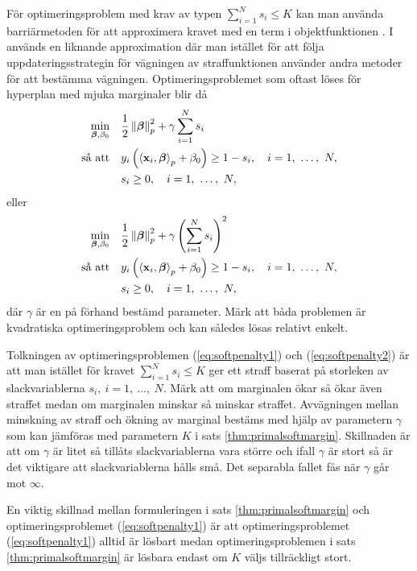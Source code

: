 \documentclass[a4paper, 12pt]{report}
\theoremstyle{definition}
\theoremstyle{remark}
\newcommand{\bfbeta}{{\boldsymbol{\beta}}}
\newcommand{\bfx}{\mathbf{x}}
\newcommand{\llangle}{\left\langle}
\newcommand{\rrangle}{\right\rangle}
\newcommand{\inner}[2]{\llangle #1, #2 \rrangle}
\begin{document}
För optimeringsproblem med krav av typen $\sum_{i=1}^{N}s_i\leq K$ kan man använda barriärmetoden för att approximera kravet med en term i objektfunktionen \cite{Boyd}. I \cite{CortesVapnik} används en liknande approximation där man istället för att följa uppdateringsstrategin för vägningen av straffunktionen använder andra metoder för att bestämma vägningen. Optimeringsproblemet som oftast löses för hyperplan med mjuka marginaler blir då
\begin{equation}\label{eq:softpenalty1}
\begin{aligned}
	\operatornamewithlimits{min}_{\bfbeta, \beta_0} & & &\frac{1}{2}\left\|\bfbeta
\right\|_p^2 + \gamma\sum_{i=1}^{N} s_i\\
	\text{så att} & & &y_i\left(\inner{\bfx_i}{\bfbeta}_p+\beta_0\right)\geq 1 - s_i,\quad i=1,~\dots,~N,\\
	& & &s_i\geq0,\quad i=1,~\dots,~N,
\end{aligned}
\end{equation}
eller
\begin{equation}\label{eq:softpenalty2}
\begin{aligned}
\operatornamewithlimits{min}_{\bfbeta, \beta_0} & & &\frac{1}{2}\left\|\bfbeta
\right\|_p^2 + \gamma\left(\sum_{i=1}^{N} s_i\right)^2\\
\text{så att} & & &y_i\left(\inner{\bfx_i}{\bfbeta}_p+\beta_0\right)\geq 1 - s_i,\quad i=1,~\dots,~N,\\
& & &s_i\geq0,\quad i=1,~\dots,~N,
\end{aligned}
\end{equation}
där $\gamma$ är en på förhand bestämd parameter.
Märk att båda problemen är kvadratiska optimeringsproblem och kan således lösas relativt enkelt.

Tolkningen av optimeringsproblemen (\ref{eq:softpenalty1}) och (\ref{eq:softpenalty2}) är att man istället för kravet $\sum_{i=1}^{N}s_i\leq K$ ger ett straff baserat på storleken av slackvariablerna $s_i,~i=1,~\dots,~N$. Märk att om marginalen ökar så ökar även straffet medan om marginalen minskar så minskar straffet. Avvägningen mellan minskning av straff och ökning av marginal bestäms med hjälp av parametern $\gamma$ som kan jämföras med parametern $K$ i sats \ref{thm:primalsoftmargin}. Skillnaden är att om $\gamma$ är litet så tillåts slackvariablerna vara större och ifall $\gamma$ är stort så är det viktigare att slackvariablerna hålls små. Det separabla fallet fås när $\gamma$ går mot $\infty$.

En viktig skillnad mellan formuleringen i sats \ref{thm:primalsoftmargin} och optimeringsproblemet (\ref{eq:softpenalty1}) är att optimeringsproblemet (\ref{eq:softpenalty1}) alltid är lösbart medan optimeringsproblemen i sats \ref{thm:primalsoftmargin} är lösbara endast om $K$ väljs tillräckligt stort.
\end{document}
